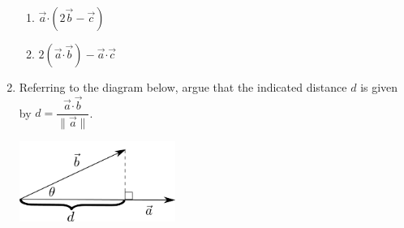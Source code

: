 \documentclass[12pt]{article}
\newcommand{\len}[1]{\lVert #1\rVert}
\newcommand{\dotp}{\boldsymbol{\cdot}}
\begin{document}
\begin{enumerate}
\begin{enumerate}
 \item $\vec{a}\dotp (2\vec{b}-\vec{c})$

\vspace{3cm}

 \item $2(\vec{a}\dotp \vec{b}) - \vec{a}\dotp\vec{c}$
\end{enumerate}

\vspace{3cm}

\item Referring to the diagram below, argue that the indicated distance $d$ is given by $d = \dfrac{\vec{a}\dotp\vec{b}}{\len{\vec{a}}}$.
\begin{flushleft}
 \includegraphics[width=2in]{WS2_proj}
\end{flushleft}




 \end{enumerate}
\end{document}
